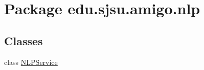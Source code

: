 \hypertarget{namespaceedu_1_1sjsu_1_1amigo_1_1nlp}{}\section{Package edu.\+sjsu.\+amigo.\+nlp}
\label{namespaceedu_1_1sjsu_1_1amigo_1_1nlp}
\subsection*{Classes}
\begin{DoxyCompactItemize}
\item 
class \hyperlink{classedu_1_1sjsu_1_1amigo_1_1nlp_1_1_n_l_p_service}{N\+L\+P\+Service}
\end{DoxyCompactItemize}
